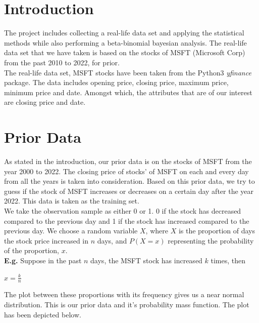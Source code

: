 \documentclass[conference]{IEEEtran}
\begin{document}
\section{Introduction}
The project includes collecting a real-life data set and applying the statistical methods while also performing a beta-binomial bayesian analysis. The real-life data set that we have taken is based on the stocks of MSFT (Microsoft Corp) from the past 2010 to 2022, for prior.  \\

The real-life data set, MSFT stocks have been taken from the Python3 \textit{yfinance} package. The data includes opening price, closing price, maximum price, minimum price and date. Amongst which, the attributes that are of our interest are closing price and date. 


\section{Prior Data}
As stated in the introduction, our prior data is on the stocks of MSFT from the year 2000 to 2022. The closing price of stocks' of MSFT on each and every day from all the years is taken into consideration. Based on this prior data, we try to guess if the stock of MSFT increases or decreases on a certain day after the year 2022. This data is taken as the training set. \\

We take the observation sample as either 0 or 1. 0 if the stock has decreased compared to the previous day and 1 if the stock has increased compared to the previous day. We choose a random variable $X$, where $X$ is the proportion of days the stock price increased in $n$ days, and $P(X = x)$ representing the probability of the proportion, $x$. \\

\newpage
\textbf{E.g.} Suppose in the past $n$ days, the MSFT stock has increased $k$ times, then
\begin{center}
    $x = \frac{k}{n}$
\end{center}

The plot between these proportions with its frequency gives us a near normal distribution. This is our prior data and it's probability mass function. The plot has been depicted below.


\end{document}
